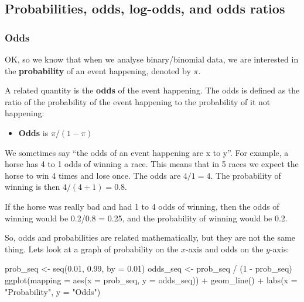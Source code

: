\documentclass[
  letterpaper,
  8pt,
  a4paper]{book}
\newenvironment{Shaded}{\begin{snugshade}}{\end{snugshade}}
\newcommand{\AttributeTok}[1]{\textcolor[rgb]{0.40,0.45,0.13}{#1}}
\newcommand{\DecValTok}[1]{\textcolor[rgb]{0.68,0.00,0.00}{#1}}
\newcommand{\FloatTok}[1]{\textcolor[rgb]{0.68,0.00,0.00}{#1}}
\newcommand{\FunctionTok}[1]{\textcolor[rgb]{0.28,0.35,0.67}{#1}}
\newcommand{\NormalTok}[1]{\textcolor[rgb]{0.00,0.23,0.31}{#1}}
\newcommand{\OtherTok}[1]{\textcolor[rgb]{0.00,0.23,0.31}{#1}}
\newcommand{\SpecialCharTok}[1]{\textcolor[rgb]{0.37,0.37,0.37}{#1}}
\newcommand{\StringTok}[1]{\textcolor[rgb]{0.13,0.47,0.30}{#1}}
\providecommand{\tightlist}{%
  \setlength{\itemsep}{0pt}\setlength{\parskip}{0pt}}
\begin{document}
\subsection*{Probabilities, odds, log-odds, and odds
ratios}\label{probabilities-odds-log-odds-and-odds-ratios}

\subsubsection*{Odds}\label{odds}

OK, so we know that when we analyse binary/binomial data, we are
interested in the \textbf{probability} of an event happening, denoted by
\(\pi\).

A related quantity is the \textbf{odds} of the event happening. The odds
is defined as the ratio of the probability of the event happening to the
probability of it not happening:

\begin{itemize}
\tightlist
\item
  \textbf{Odds} is \(\pi/(1-\pi)\)
\end{itemize}

We sometimes say ``the odds of an event happening are x to y''. For
example, a horse has 4 to 1 odds of winning a race. This means that in 5
races we expect the horse to win 4 times and lose once. The odds are
\(4/1 = 4\). The probability of winning is then \(4/(4+1) = 0.8\).

If the horse was really bad and had 1 to 4 odds of winning, then the
odds of winning would be 0.2/0.8 = 0.25, and the probability of winning
would be 0.2.

So, odds and probabilities are related mathematically, but they are not
the same thing. Lets look at a graph of probability on the \(x\)-axis
and odds on the \(y\)-axis:

\begin{Shaded}
\begin{Highlighting}[]
\NormalTok{prob\_seq }\OtherTok{\textless{}{-}} \FunctionTok{seq}\NormalTok{(}\FloatTok{0.01}\NormalTok{, }\FloatTok{0.99}\NormalTok{, }\AttributeTok{by =} \FloatTok{0.01}\NormalTok{)}
\NormalTok{odds\_seq }\OtherTok{\textless{}{-}}\NormalTok{ prob\_seq }\SpecialCharTok{/}\NormalTok{ (}\DecValTok{1} \SpecialCharTok{{-}}\NormalTok{ prob\_seq)}
\FunctionTok{ggplot}\NormalTok{(}\AttributeTok{mapping =} \FunctionTok{aes}\NormalTok{(}\AttributeTok{x =}\NormalTok{ prob\_seq, }\AttributeTok{y =}\NormalTok{ odds\_seq)) }\SpecialCharTok{+}
  \FunctionTok{geom\_line}\NormalTok{() }\SpecialCharTok{+}
  \FunctionTok{labs}\NormalTok{(}\AttributeTok{x =} \StringTok{"Probability"}\NormalTok{, }\AttributeTok{y =} \StringTok{"Odds"}\NormalTok{) }
\end{Highlighting}
\end{Shaded}
\end{document}
